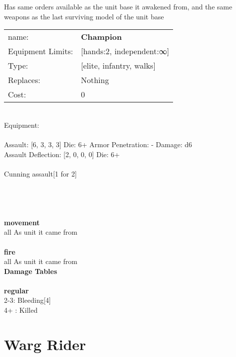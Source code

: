 \noindent Has same orders available as the unit base it awakened from, and the same weapons as the last surviving model of the unit base\\ 


\noindent
\begin{tabular}{ll}
name: &{\bf Champion } \\
Equipment Limits: &[hands:2, independent:∞] \\
Type: &[elite, infantry, walks] \\
Replaces: &Nothing \\
Cost: & 0\\
\end{tabular}
\ \\
Equipment:  \\
\ \\
Assault: [6, 3, 3, 3] Die: 6+ Armor Penetration: - Damage: d6 \\
Assault Deflection: [2, 0, 0, 0] Die: 6+\\
\\ 
Cunning assault[1 for 2]\\ 
 
\ \\

\ \\
 
\ \\



\ \\ {\bf movement } \\
all As unit it came from \\
\ \\ {\bf fire } \\
all As unit it came from \\


{\bf Damage Tables} \\
\ \\ {\bf regular } \\
2-3: Bleeding[4] \\
4+ : Killed \\










\pagebreak\pagebreak

\section{ Warg Rider }

